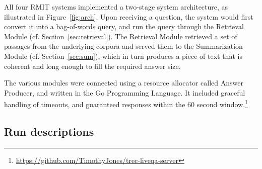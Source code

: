 \documentclass[a4paper,10pt,conference,compsocconf,final]{IEEEtran}
\newcommand\method[1]{{\sf\small{#1}}}
\newcommand{\joel}[1]{\textrm{\textcolor{magenta}{Joel says: #1}}}
\begin{document}
All four RMIT systems implemented a two-stage system architecture, as
illustrated in Figure~\ref{fig:arch}.
Upon receiving a question, the system would first convert it into a
bag-of-words query, and run the query through the Retrieval Module
(cf.  Section~\ref{sec:retrieval}).
The Retrieval Module retrieved a set of passages from the underlying
corpora and served them to the Summarization Module (cf.
Section~\ref{sec:sum}), which in turn produces a piece of text
that is coherent and long enough to fill the required answer size.



The various modules were connected using a resource allocator called
{\small{\sf Answer Producer}}, and written in the Go Programming Language.
It included graceful handling of timeouts, and guaranteed responses
within the 60 second
window.\footnote{\url{https://github.com/TimothyJones/trec-liveqa-server}}

\subsection{Run descriptions}
\label{sec:runs}

\end{document}
